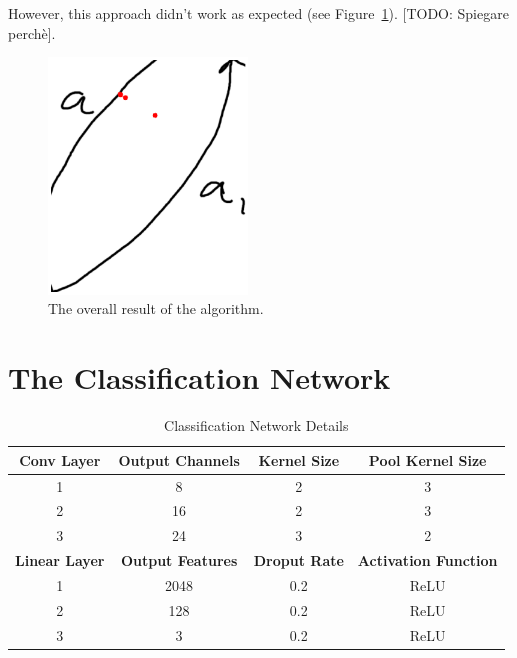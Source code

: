 \documentclass[conference]{IEEEtran}
\begin{document}
\begin{appendices}
However, this approach didn't work as expected (see Figure~\ref{fig:template_matching_fail}). [TODO: Spiegare perchè].

\begin{figure}[H]
	\centering
	\includegraphics[width=150pt]{template_matching_fail.png}
	\caption{The overall result of the algorithm.}
	\label{fig:template_matching_fail}
\end{figure}

\section{The Classification Network}
\label{classification_net}

\begin{table}[h]
	\centering
	\caption{Classification Network Details}
	\label{tab:classification-architecture}
	\begin{tabular}{|c|c|c|c|}
		\hline
		\textbf{Conv Layer} & \textbf{Output Channels} & \textbf{Kernel Size} & \textbf{Pool Kernel Size} \\
		\hline 
		1 & 8 & 2 & 3 \\
		2 & 16 & 2  & 3 \\
		3 & 24 & 3  & 2 \\
		\hline
		\textbf{Linear Layer} & \textbf{Output Features} & \textbf{Droput Rate} & \textbf{Activation Function} \\
		\hline 
		1 & 2048 & 0.2 & ReLU \\
		2 & 128 & 0.2 & ReLU \\
		3 & 3 & 0.2 & ReLU \\
		\hline
	\end{tabular}
\end{table}

\end{appendices}
\end{document}
